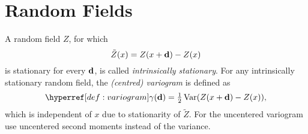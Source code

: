 \section{Random Fields}



\begin{definition}[Variogram]
	\label{def: variogram}
	A random field \(Z\), for which
	\[
		\tilde{Z}(x) = Z(x+\mathbf{d})- Z(x)
	\]
	is stationary for every \(\mathbf{d}\), is called \emph{intrinsically stationary}.
	For any intrinsically stationary random field, the \emph{(centred) variogram} is
	defined as
	\[
		\variogram(\step)	= \tfrac12\Var(Z(x+\step)-Z(x)),
	\]
	which is independent of \(x\) due to stationarity of \(\tilde{Z}\). For the
	uncentered variogram use uncentered second moments instead of the variance.
\end{definition}

